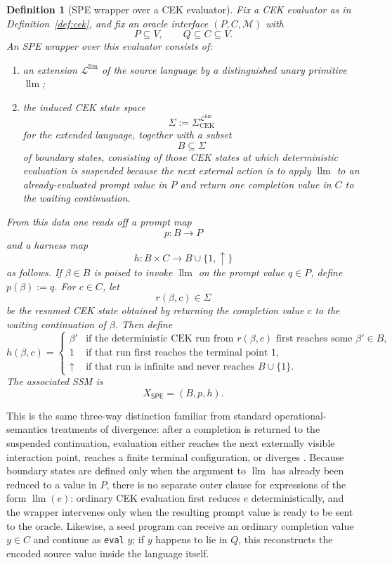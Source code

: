 \documentclass[11pt]{article}
\newtheorem{definition}{Definition}[section]
\newcommand{\SPE}{\mathsf{SPE}}
\newcommand{\llm}{\operatorname{llm}}
\begin{document}
\begin{definition}[SPE wrapper over a CEK evaluator]\label{def:spe}
Fix a CEK evaluator as in Definition~\ref{def:cek}, and fix an oracle interface $(P,C,\mathcal{M})$ with
\[
P\subseteq V,
\qquad
Q\subseteq C\subseteq V.
\]
An \emph{SPE wrapper} over this evaluator consists of:
\begin{enumerate}[label=(\roman*)]
    \item an extension $\mathcal{L}^{\llm}$ of the source language by a distinguished unary primitive $\llm$;
    \item the induced CEK state space
    \[
    \Sigma:=\Sigma_{\mathrm{CEK}}^{\mathcal{L}^{\llm}}
    \]
    for the extended language, together with a subset
    \[
    B\subseteq \Sigma
    \]
    of \emph{boundary states}, consisting of those CEK states at which deterministic evaluation is suspended because the next external action is to apply $\llm$ to an already-evaluated prompt value in $P$ and return one completion value in $C$ to the waiting continuation.
\end{enumerate}
From this data one reads off a prompt map
\[
p:B\to P
\]
and a harness map
\[
h:B\times C\to B\cup\{1,\uparrow\}
\]
as follows. If $\beta\in B$ is poised to invoke $\llm$ on the prompt value $q\in P$, define $p(\beta):=q$. For $c\in C$, let
\[
r(\beta,c)\in \Sigma
\]
be the resumed CEK state obtained by returning the completion value $c$ to the waiting continuation of $\beta$. Then define
\[
h(\beta,c)=
\begin{cases}
\beta' & \text{if the deterministic CEK run from } r(\beta,c) \text{ first reaches some } \beta'\in B,\\
1 & \text{if that run first reaches the terminal point } 1,\\
\uparrow & \text{if that run is infinite and never reaches } B\cup\{1\}.
\end{cases}
\]
The associated SSM is
\[
X_{\SPE}=(B,p,h).
\]
\end{definition}

This is the same three-way distinction familiar from standard operational-semantics treatments of divergence: after a completion is returned to the suspended continuation, evaluation either reaches the next externally visible interaction point, reaches a finite terminal configuration, or diverges \cite{LeroyGrall09}. Because boundary states are defined only when the argument to $\llm$ has already been reduced to a value in $P$, there is no separate outer clause for expressions of the form $\llm(e)$: ordinary CEK evaluation first reduces $e$ deterministically, and the wrapper intervenes only when the resulting prompt value is ready to be sent to the oracle. Likewise, a seed program can receive an ordinary completion value $y\in C$ and continue as \texttt{eval} $y$; if $y$ happens to lie in $Q$, this reconstructs the encoded source value inside the language itself.
\end{document}
